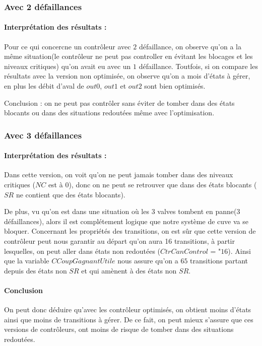 \documentclass[a4paper]{book}
\begin{document}
\subsubsection{Avec 2 défaillances}

\paragraph{Interprétation des résultats :}
Pour ce qui concercne un contrôleur avec $2$ défaillance, on observe qu'on a la même situation(le contrôleur ne peut pas controller en évitant les blocages et les niveaux critiques) qu'on avait eu avec un $1$ défaillance.
Toutfois, si on compare les résultats avec la version non optimisée, on observe qu'on a mois d'états à gérer, en plus les débit d'aval de $out0$, $out1$ et $out2$ sont bien optimisés.

Conclusion : on ne peut pas contrôler sans éviter de tomber dans des états blocants ou dans des situations redoutées même avec l'optimisation.

\subsubsection{Avec 3 défaillances}

\paragraph{Interprétation des résultats : }
Dans cette version, on voit qu'on ne peut jamais tomber dans des niveaux critiques ($NC$ est à 0), donc on ne peut se retrouver que dans des états blocants ($SR$ ne contient que des états blocants).

De plus, vu qu'on est dans une situation où les 3 valves tombent en panne(3 défaillances), alors il est complétement logique que notre système de cuve va se bloquer.
Concernant les propriétés des transitions, on est sûr que cette version de contrôleur peut nous garantir au départ qu'on aura 16 transitions, à partir lesquelles, on peut aller dans états non redoutées ($CtrCanControl$ = "$16$).
Ainsi que la variable $CCoupGagnantUtile$ nous assure qu'on a $65$ transitions partant depuis des états non $SR$ et qui amènent à des états non $SR$.
\paragraph{Conclusion}
On peut donc déduire qu'avec les contrôleur optimisés, on obtient moins d'états ainsi que moins de transitions à gérer.
De ce fait, on peut mieux s'assure que ces versions de contrôleurs, ont moins de risque de tomber dans des situations redoutées.
\end{document}
